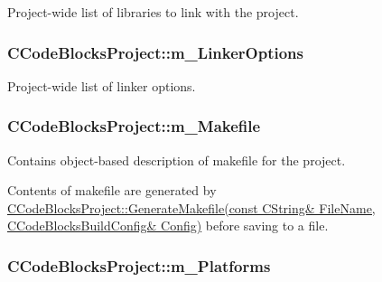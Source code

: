 Project-\/wide list of libraries to link with the project. 

\hypertarget{classCCodeBlocksProject_a0267339a7092c081a8a4f953a44f488e}{
\subsubsection[{m\-\_\-\-Linker\-Options}]{\setlength{\rightskip}{0pt plus 5cm}C\-Code\-Blocks\-Project\-::m\-\_\-\-Linker\-Options\hspace{0.3cm}{\ttfamily [private]}}}\label{classCCodeBlocksProject_a0267339a7092c081a8a4f953a44f488e}


Project-\/wide list of linker options. 

\hypertarget{classCCodeBlocksProject_afc80f4ccaa90f3aeef908877606ac861}{
\subsubsection[{m\-\_\-\-Makefile}]{\setlength{\rightskip}{0pt plus 5cm}C\-Code\-Blocks\-Project\-::m\-\_\-\-Makefile\hspace{0.3cm}{\ttfamily [private]}}}\label{classCCodeBlocksProject_afc80f4ccaa90f3aeef908877606ac861}


Contains object-\/based description of makefile for the project. 

Contents of makefile are generated by \hyperlink{classCCodeBlocksProject_aa2b01dbf48f2a193a0bc426bc50ce77b}{C\-Code\-Blocks\-Project\-::\-Generate\-Makefile(const C\-String\& File\-Name, C\-Code\-Blocks\-Build\-Config\& Config)} before saving to a file. \hypertarget{classCCodeBlocksProject_a02182ff5699ad56dec022a0061a883b8}{
\subsubsection[{m\-\_\-\-Platforms}]{\setlength{\rightskip}{0pt plus 5cm}C\-Code\-Blocks\-Project\-::m\-\_\-\-Platforms\hspace{0.3cm}{\ttfamily [private]}}}\label{classCCodeBlocksProject_a02182ff5699ad56dec022a0061a883b8}


